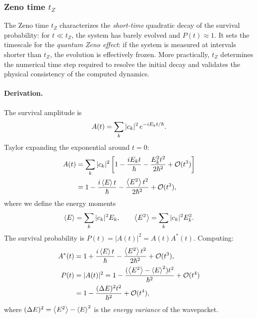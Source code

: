 \subsubsection{Zeno time $t_Z$}\label{sec:zeno}

\begin{remark}
The Zeno time $t_Z$ characterizes the \emph{short-time} quadratic decay of the survival probability: for $t \ll t_Z$, the system has barely evolved and $P(t) \approx 1$.
It sets the timescale for the \emph{quantum Zeno effect}: if the system is measured at intervals shorter than $t_Z$, the evolution is effectively frozen.
More practically, $t_Z$ determines the numerical time step required to resolve the initial decay and validates the physical consistency of the computed dynamics.
\end{remark}

\paragraph{Derivation.}

The survival amplitude is
\begin{equation}
  A(t) = \sum_k |c_k|^2\,e^{-iE_k t/\hbar}.
\end{equation}
Taylor expanding the exponential around $t = 0$:
\begin{align}
  A(t) &= \sum_k |c_k|^2\left[1 - \frac{iE_k t}{\hbar} - \frac{E_k^2 t^2}{2\hbar^2} + \mathcal{O}(t^3)\right]\notag\\
  &= 1 - \frac{i\expval{E}t}{\hbar} - \frac{\expval{E^2}t^2}{2\hbar^2} + \mathcal{O}(t^3),
\end{align}
where we define the energy moments
\begin{equation}
  \expval{E} = \sum_k |c_k|^2 E_k, \qquad \expval{E^2} = \sum_k |c_k|^2 E_k^2.
\end{equation}
The survival probability is $P(t) = |A(t)|^2 = A(t)A^*(t)$.
Computing:
\begin{align}
  A^*(t) &= 1 + \frac{i\expval{E}t}{\hbar} - \frac{\expval{E^2}t^2}{2\hbar^2} + \mathcal{O}(t^3),\\
  P(t) &= |A(t)|^2 = 1 - \frac{(\expval{E^2} - \expval{E}^2)t^2}{\hbar^2} + \mathcal{O}(t^4)\notag\\
  &= 1 - \frac{(\Delta E)^2 t^2}{\hbar^2} + \mathcal{O}(t^4),
\end{align}
where $(\Delta E)^2 = \expval{E^2} - \expval{E}^2$ is the \emph{energy variance} of the wavepacket.

